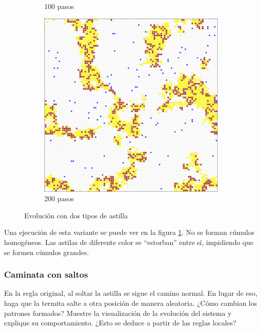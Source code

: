 \documentclass{article}
\begin{document}
\begin{figure}
\begin{subfigure}{0.3\textwidth}
    \caption{100 pasos}
  \end{subfigure}
  \begin{subfigure}{0.3\textwidth}
    \includegraphics[width=\textwidth]{imgs/termites-chips5.png}
    \caption{200 pasos}
  \end{subfigure}
  \caption{Evolución con dos tipos de astilla}
  \label{fig:termite-2chips}
\end{figure}

Una ejecución de esta variante se puede ver en la figura
\ref{fig:termite-2chips}. No se forman cúmulos homogéneos. Las astilas de
diferente color se ``estorban'' entre sí, impidiendo que se formen cúmulos
grandes.

\subsubsection{Caminata con saltos}

En la regla original, al soltar la astilla se sigue el camino normal. En lugar
de eso, haga que la termita salte a otra posición de manera aleatoria. ¿Cómo
cambian los patrones formados? Muestre la visualización de la evolución del
sistema y explique su comportamiento. ¿Esto se deduce a partir de las reglas
locales?
\end{document}
